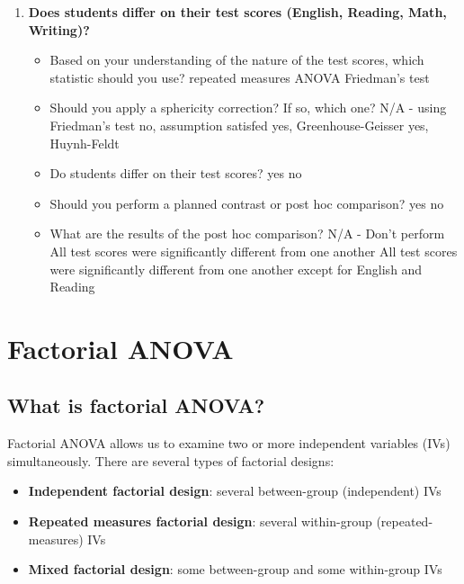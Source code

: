 \documentclass[
]{book}
\providecommand{\tightlist}{%
  \setlength{\itemsep}{0pt}\setlength{\parskip}{0pt}}
\begin{document}
\begin{enumerate}
\def\labelenumi{\arabic{enumi}.}
\item
  \textbf{Does students differ on their test scores (English, Reading, Math, Writing)?}

  \begin{itemize}
  \item
    Based on your understanding of the nature of the test scores, which statistic should you use? repeated measures ANOVA Friedman's test
  \item
    Should you apply a sphericity correction? If so, which one? N/A - using Friedman's test no, assumption satisfed yes, Greenhouse-Geisser yes, Huynh-Feldt
  \item
    Do students differ on their test scores? yes no
  \item
    Should you perform a planned contrast or post hoc comparison? yes no
  \item
    What are the results of the post hoc comparison? N/A - Don't perform All test scores were significantly different from one another All test scores were significantly different from one another except for English and Reading
  \end{itemize}
\end{enumerate}

\hypertarget{factorial-anova}{%
\chapter{Factorial ANOVA}\label{factorial-anova}}

\hypertarget{what-is-factorial-anova}{%
\section{What is factorial ANOVA?}\label{what-is-factorial-anova}}

Factorial ANOVA allows us to examine two or more independent variables (IVs) simultaneously. There are several types of factorial designs:

\begin{itemize}
\tightlist
\item
  \textbf{Independent factorial design}: several between-group (independent) IVs
\item
  \textbf{Repeated measures factorial design}: several within-group (repeated-measures) IVs
\item
  \textbf{Mixed factorial design}: some between-group and some within-group IVs
\end{itemize}
\end{document}
